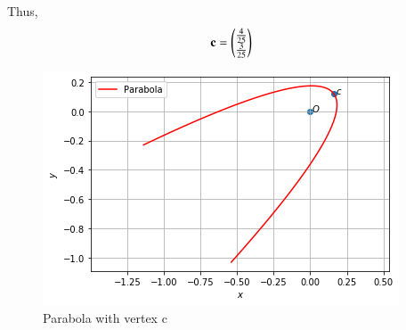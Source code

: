 \documentclass[journal,12pt,twocolumn]{IEEEtran}
\begin{document}
Thus,
\begin{align}
    \vec{c} = \myvec{\frac{4}{25}\\\frac{3}{25}} %
\end{align}
\renewcommand{\thefigure}{1}
\begin{figure}[h!]
    \centering
    \includegraphics[width=\columnwidth]{A6.png}
    \caption{Parabola with vertex c}
    \label{fig:fig1}
\end{figure}
\end{document}

